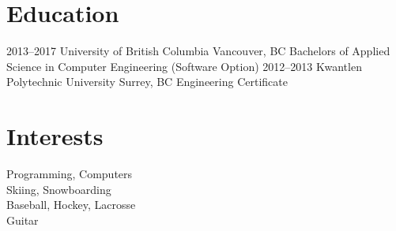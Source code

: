\documentclass[]{friggeri-cv} %
\begin{document}

\section{Education}

\begin{entrylist}
\entry
{2013--2017}
{University of British Columbia}
{Vancouver, BC}
{Bachelors of Applied Science in Computer Engineering (Software Option)}
\entry
{2012--2013}
{Kwantlen Polytechnic University} %
{Surrey, BC}
{Engineering Certificate}
\end{entrylist}






\section{Interests}

Programming, Computers \\
Skiing, Snowboarding \\
Baseball, Hockey, Lacrosse \\
Guitar \\
\end{document}
